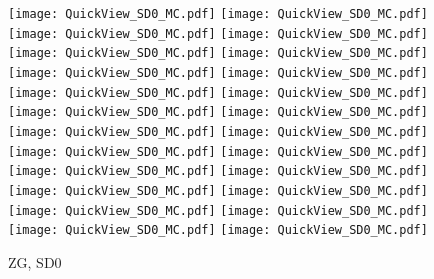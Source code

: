 \documentclass[amsmath,amssymb,aps,floatfix]{revtex4-1}
\begin{document}
\begin{figure}
   \centering
   \texttt{[image: QuickView\_SD0\_MC.pdf]}
   \texttt{[image: QuickView\_SD0\_MC.pdf]}
   \texttt{[image: QuickView\_SD0\_MC.pdf]}
   \texttt{[image: QuickView\_SD0\_MC.pdf]}\\
   \texttt{[image: QuickView\_SD0\_MC.pdf]}
   \texttt{[image: QuickView\_SD0\_MC.pdf]}
   \texttt{[image: QuickView\_SD0\_MC.pdf]}
   \texttt{[image: QuickView\_SD0\_MC.pdf]}\\
   \texttt{[image: QuickView\_SD0\_MC.pdf]}
   \texttt{[image: QuickView\_SD0\_MC.pdf]}
   \texttt{[image: QuickView\_SD0\_MC.pdf]}
   \texttt{[image: QuickView\_SD0\_MC.pdf]}\\
   \texttt{[image: QuickView\_SD0\_MC.pdf]}
   \texttt{[image: QuickView\_SD0\_MC.pdf]}
   \texttt{[image: QuickView\_SD0\_MC.pdf]}
   \texttt{[image: QuickView\_SD0\_MC.pdf]}\\
   \texttt{[image: QuickView\_SD0\_MC.pdf]}
   \texttt{[image: QuickView\_SD0\_MC.pdf]}
   \texttt{[image: QuickView\_SD0\_MC.pdf]}
   \texttt{[image: QuickView\_SD0\_MC.pdf]}\\
   \texttt{[image: QuickView\_SD0\_MC.pdf]}
   \texttt{[image: QuickView\_SD0\_MC.pdf]}
   \texttt{[image: QuickView\_SD0\_MC.pdf]}
   \texttt{[image: QuickView\_SD0\_MC.pdf]}\\
   \caption{ZG, SD0}
   \label{Figure:SD0Result}
\end{figure}
\end{document}
